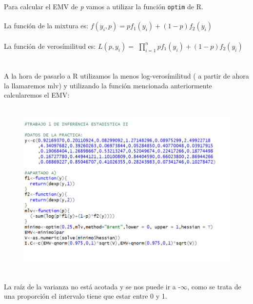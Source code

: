 \documentclass[10pt,a4paper]{article}
\begin{document}
Para calcular el EMV de \textit{p} vamos a utilizar la función \texttt{optim} de R.\\
\\
La función de la mixtura es: $f(y_{i},p) = pf_{1}(y_{i}) + (1-p)f_{2}(y_{i})$\\
\\
La función de verosímilitud es: $L(p,y_{i})=$
$\displaystyle\prod_{i=1}^{n} pf_{1}(y_{i}) + (1-p)f_{2}(y_{i})
$\\
\\
\\
A la hora de pasarlo a R utilizamos la menos log-verosímilitud ( a partir de ahora la llamaremos mlv) y utilizando la función mencionada anteriormente calcularemos el EMV:\\

\begin{figure}[h]
	\includegraphics[width=13cm, height=9cm]{APARTADO A.PNG}
	\centering
\end{figure}
\begin{figure}[h]
	\centering
\end{figure}
\begin{figure}[h]
	\centering
\end{figure}
La raíz de la varianza no está acotada y se nos puede ir a -$\infty$, como se trata de una proporción el intervalo tiene que estar entre 0 y 1.


\newpage
\end{document}
